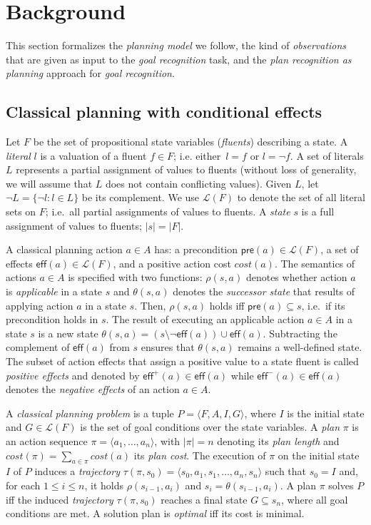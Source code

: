 \documentclass{article}
\newcommand{\tup}[1]{{\langle #1 \rangle}}
\newcommand{\pre}{\mathsf{pre}}     %
\newcommand{\eff}{\mathsf{eff}}     %
\begin{document}
\section{Background}
\label{sec:background}
This section formalizes the {\em planning model} we follow, the kind of {\em observations} that are given as input to the {\em goal recognition} task, and the {\em plan recognition as planning} approach for {\em goal recognition}.  

\subsection{Classical planning with conditional effects}
Let $F$ be the set of  propositional state variables ({\em fluents}) describing a state. A {\em literal} $l$ is a valuation of a fluent $f\in F$; i.e. either~$l=f$ or $l=\neg f$. A set of literals $L$ represents a partial assignment of values to fluents (without loss of generality, we will assume that $L$ does not contain conflicting values). Given $L$, let $\neg L=\{\neg l:l\in L\}$ be its complement. We use $\mathcal{L}(F)$ to denote the set of all literal sets on $F$; i.e.~all partial assignments of values to fluents. A {\em state} $s$ is a full assignment of values to fluents; $|s|=|F|$.

A classical planning action $a\in A$ has: a precondition $\pre(a)\in\mathcal{L}(F)$, a set of effects $\eff(a)\in\mathcal{L}(F)$, and a positive action cost $cost(a)$. The semantics of actions $a\in A$ is specified with two functions: $\rho(s,a)$ denotes whether action $a$ is {\em applicable} in a state $s$ and $\theta(s,a)$ denotes the {\em successor state} that results of applying action $a$ in a state $s$. Then, $\rho(s,a)$ holds iff $\pre(a)\subseteq s$, i.e.~if its precondition holds in $s$. The result of executing an applicable action $a\in A$ in a state $s$ is a new state $\theta(s,a)=(s\setminus \neg\eff(a))\cup\eff(a)$. Subtracting the complement of $\eff(a)$ from $s$ ensures that $\theta(s,a)$ remains a well-defined state. The subset of action effects that assign a positive value to a state fluent is called {\em positive effects} and denoted by $\eff^+(a)\in \eff(a)$ while $\eff^-(a)\in \eff(a)$ denotes the {\em negative effects} of an action $a\in A$.

A {\em classical planning problem} is a tuple $P=\tup{F,A,I,G}$, where $I$ is the initial state and $G\in\mathcal{L}(F)$ is the set of goal conditions over the state variables. A {\em plan} $\pi$ is an action sequence $\pi=\tup{a_1, \ldots, a_n}$, with $|\pi|=n$ denoting its {\em plan length} and $cost(\pi)=\sum_{a\in\pi} cost(a)$ its {\em plan cost}. The execution of $\pi$ on the initial state $I$ of $P$ induces a {\em trajectory} $\tau(\pi,s_0)=\tup{s_0, a_1, s_1, \ldots, a_n, s_n}$ such that $s_0=I$ and, for each {\small $1\leq i\leq n$}, it holds $\rho(s_{i-1},a_i)$ and $s_i=\theta(s_{i-1},a_i)$. A plan $\pi$ solves $P$ iff the induced {\em trajectory} $\tau(\pi,s_0)$ reaches a final state $G \subseteq s_n$, where all goal conditions are met. A solution plan is {\em optimal} iff its cost is minimal.
\end{document}
